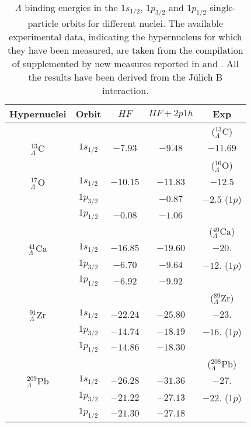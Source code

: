 \begin{table}
\caption{ $\Lambda$ binding energies in the $1 s_{1/2}$, $1 p_{3/2}$ and
 $1 p_{1/2}$ single-particle orbits 
  for different
nuclei. The available experimental data, indicating the hypernucleus for which they have been
measured, are taken from the compilation of \protect\cite{bando90} supplemented by new measures reported
in \protect\cite{pile91} and \protect\cite{hase96}. All the results have been derived from the J\"ulich 
B interaction.}
\bigskip
\bigskip
\begin{tabular}{ c | c c c c  }
Hypernuclei \phantom{caca}& Orbit & $HF$ & $HF+2p1h$ &  Exp{}  \\
\hline
&&&&($^{13}_{\Lambda}$C) \\
$^{13}_{\Lambda}$C \phantom{cac}& $1 s_{1/2}$ & $-7.93$ & $-9.48$ & $-11.69$  {}\\
\hline
&&&&($^{16}_{\Lambda}$O){}\\
$^{17}_{\Lambda}$O \phantom{cac}& $1 s_{1/2}$ & $-10.15$ & $-11.83$ & $-12.5$ {}\\
 & $1 p_{3/2}$ &       & $-0.87$ & $-2.5$ ($1p$){}\\
 & $1 p_{1/2}$ & $-0.08$ & $-1.06$ & \\
\hline
&&&&($^{40}_{\Lambda}$Ca){}\\
$^{41}_{\Lambda}$Ca \phantom{cac}& $1 s_{1/2}$ & $-16.85$ & $-19.60$ & $-20.$ {}\\
 & $1 p_{3/2}$ & $-6.70$      & $-9.64$ & $-12.$ ($1p$){}\\
 & $1 p_{1/2}$ & $-6.92$ & $-9.92$ & {}\\
\hline
&&&&($^{89}_{\Lambda}$Zr) \\
$^{91}_{\Lambda}$Zr \phantom{cac}& $1 s_{1/2}$ & $-22.24$ & $-25.80$ & $-23.$ {}\\
 & $1 p_{3/2}$ & $-14.74$      & $-18.19$ & $-16.$ ($1p$){}\\
 & $1 p_{1/2}$ & $-14.86$ & $-18.30$ & {}\\
\hline
&&&&($^{208}_{\Lambda}$Pb) \\
$^{209}_{\Lambda}$Pb \phantom{cac}& $1 s_{1/2}$ & $-26.28$ & $-31.36$ & $-27.$ {}\\
 & $1 p_{3/2}$ & $-21.22$      & $-27.13$  & $-22.$ ($1p$) {}\\
 & $1 p_{1/2}$ & $-21.30$ & $-27.18$ &{}\\
\end{tabular}
\label{tab:ener}
\end{table}




